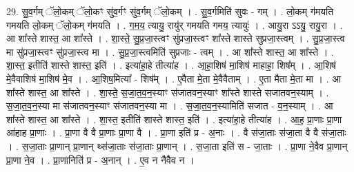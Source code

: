 \documentclass[17pt]{extarticle}
\begin{document}
29. सु॒व॒र्गम् ॅलो॒कम् ॅलो॒कꣳ सु॑व॒र्गꣳ सु॑व॒र्गम् ॅलो॒कम् । . सु॒व॒र्गमिति॑ सुवः - गम् । . लो॒कम् ग॑मयति गमयति लो॒कम् ॅलो॒कम् ग॑मयति । . ग॒म॒य॒ त्यायु॒ रायु॑र् गमयति गमय॒ त्यायुः॑ । . आयु॒रा ऽऽयु॒ रायु॒रा । . आ शा᳚स्ते शास्त॒ आ शा᳚स्ते । . शा॒स्ते॒ सु॒प्र॒जा॒स्त्वꣳ सु॑प्रजा॒स्त्वꣳ शा᳚स्ते शास्ते सुप्रजा॒स्त्वम् । . सु॒प्र॒जा॒स्त्व मा सु॑प्रजा॒स्त्वꣳ सु॑प्रजा॒स्त्व मा । . सु॒प्र॒जा॒स्त्वमिति॑ सुप्रजाः - त्वम् । . आ शा᳚स्ते शास्त॒ आ शा᳚स्ते । . शा॒स्त॒ इतीति॑ शास्ते शास्त॒ इति॑ । . इत्या॑हा॒हे तीत्या॑ह । . आ॒हा॒शिष॑ मा॒शिष॑ माहाहा॒ शिष᳚म् । . आ॒शिष॑ मे॒वैवाशिष॑ मा॒शिष॑ मे॒व । . आ॒शिष॒मित्या᳚ - शिष᳚म् । . ए॒वैता मे॒ता मे॒वैवैताम् । . ए॒ता मैता मे॒ता मा । . आ शा᳚स्ते शास्त॒ आ शा᳚स्ते । . शा॒स्ते॒ स॒जा॒त॒व॒न॒स्याꣳ स॑जातवन॒स्याꣳ शा᳚स्ते शास्ते सजातवन॒स्याम् । . स॒जा॒त॒व॒न॒स्या मा स॑जातवन॒स्याꣳ स॑जातवन॒स्या मा । . स॒जा॒त॒व॒न॒स्यामिति॑ सजात - व॒न॒स्याम् । . आ शा᳚स्ते शास्त॒ आ शा᳚स्ते । . शा॒स्त॒ इतीति॑ शास्ते शास्त॒ इति॑ । . इत्या॑हा॒हे तीत्या॑ह । . आ॒ह॒ प्रा॒णाः प्रा॒णा आ॑हाह प्रा॒णाः । . प्रा॒णा वै वै प्रा॒णाः प्रा॒णा वै । . प्रा॒णा इति॑ प्र - अ॒नाः । . वै स॑जा॒ताः स॑जा॒ता वै वै स॑जा॒ताः । . स॒जा॒ताः प्रा॒णान् प्रा॒णान् थ्स॑जा॒ताः स॑जा॒ताः प्रा॒णान् । . स॒जा॒ता इति॑ स - जा॒ताः । . प्रा॒णा ने॒वैव प्रा॒णान् प्रा॒णा ने॒व । . प्रा॒णानिति॑ प्र - अ॒नान् । . ए॒व न नैवैव न । \newline
\end{document}
